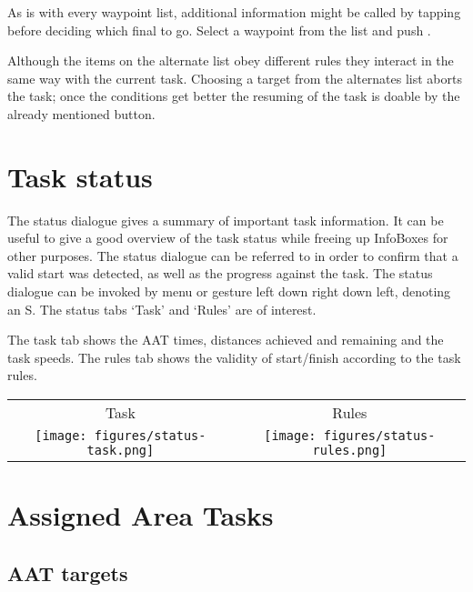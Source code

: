 As is with every waypoint list, additional information might be called by tapping  before deciding which final to go. Select a waypoint from the list and push .

Although the items on the alternate list obey different rules they interact 
in the same way 
with the current task. Choosing a target from the alternates list aborts the task; 
once the conditions get better the resuming of the task is doable by the already 
mentioned button.


\section{Task status}\label{sec:task-status}

The status dialogue gives a summary of important task information. 
 It can be useful to give a
good overview of the task status while freeing up InfoBoxes for other
purposes.  The status dialogue can be referred to in order to confirm
that a valid start was detected, as well as the progress against the
task.
The status dialogue can be invoked by menu or gesture left down right down left, denoting an S. The status tabs `Task' and `Rules' are of interest.

The task tab shows the AAT times, distances achieved and remaining and the 
task speeds. The rules tab shows the validity of start/finish according 
to the task rules.
\begin{center}
\begin{tabular}{c c}
Task & Rules \\
\texttt{[image: figures/status-task.png]} &
\texttt{[image: figures/status-rules.png]} \\
\end{tabular}
\end{center}

\section{Assigned Area Tasks}\label{sec:aat-tasks}

\subsection*{AAT targets}

